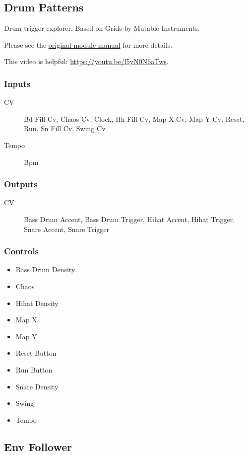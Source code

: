 \subsection{Drum Patterns}

Drum trigger explorer. Based on Grids by Mutable Instruments.



Please see the \href{https://mutable-instruments.net/modules/grids/manual/}{original module manual} for more details.

This video is helpful: \url{https://youtu.be/l5yN0N6aTws}.

\subsubsection{Inputs}
\begin{description}
\item [CV] Bd Fill Cv, Chaos Cv, Clock, Hh Fill Cv, Map X Cv, Map Y Cv, Reset, Run, Sn Fill Cv, Swing Cv
\item [Tempo] Bpm
\end{description}

\subsubsection{Outputs}
\begin{description}
\item [CV] Bass Drum Accent, Bass Drum Trigger, Hihat Accent, Hihat Trigger, Snare Accent, Snare Trigger
\end{description}

\subsubsection{Controls}
\begin{itemize}
\item Bass Drum Density
\item Chaos
\item Hihat Density
\item Map X
\item Map Y
\item Reset Button
\item Run Button
\item Snare Density
\item Swing
\item Tempo
\end{itemize}

\subsection{Env Follower}

